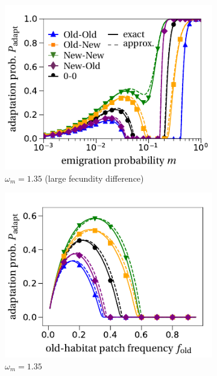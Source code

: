 \documentclass[a4paper,11pt]{article}
\begin{document}
\begin{figure}[t!]
	\centering
		\begin{subfigure}{.5\textwidth}
 		 \centering
 		 \includegraphics[width=\linewidth]{fig3a.pdf}
  		\caption{$\omega_m=1.35$ (large fecundity difference)}
	\end{subfigure}%
	    \begin{subfigure}{.5\textwidth}
 		 \centering
 		 \includegraphics[width=\linewidth]{fig3b.pdf}
  		\caption{$\omega_m=1.35$}
	\end{subfigure}
	\begin{subfigure}{.5\textwidth}
 		 \centering

\end{subfigure}
\end{figure}
\end{document}

